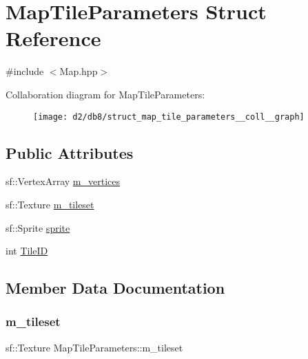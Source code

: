 \hypertarget{struct_map_tile_parameters}{}\section{Map\+Tile\+Parameters Struct Reference}
\label{struct_map_tile_parameters}


{\ttfamily \#include $<$Map.\+hpp$>$}



Collaboration diagram for Map\+Tile\+Parameters\+:
\nopagebreak
\begin{figure}[H]
\begin{center}
\leavevmode
\texttt{[image: d2/db8/struct\_map\_tile\_parameters\_\_coll\_\_graph]}
\end{center}
\end{figure}
\subsection*{Public Attributes}
\begin{DoxyCompactItemize}
\item 
sf\+::\+Vertex\+Array \mbox{\hyperlink{struct_map_tile_parameters_a37a456acd1110b590bc254bb3d193d11}{m\+\_\+vertices}}
\item 
sf\+::\+Texture \mbox{\hyperlink{struct_map_tile_parameters_a86da4b22484cbccb7e2620c333326574}{m\+\_\+tileset}}
\item 
sf\+::\+Sprite \mbox{\hyperlink{struct_map_tile_parameters_a9a36e686aa0e4a3d3fa5f299b8667b0d}{sprite}}
\item 
int \mbox{\hyperlink{struct_map_tile_parameters_ac660182507cc13ce6c421b37b5dd4039}{Tile\+ID}}
\end{DoxyCompactItemize}


\subsection{Member Data Documentation}
\mbox{\label{struct_map_tile_parameters_a86da4b22484cbccb7e2620c333326574}} 
\subsubsection{\texorpdfstring{m\+\_\+tileset}{m\_tileset}}
{\footnotesize\ttfamily sf\+::\+Texture Map\+Tile\+Parameters\+::m\+\_\+tileset}

